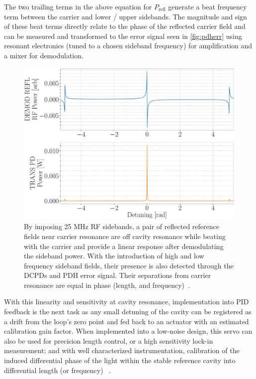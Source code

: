The two trailing terms in the above equation for $P_\mathrm{refl}$ generate a beat frequency term between the carrier and lower / upper sidebands. The magnitude and sign of these beat terms directly relate to the phase of the reflected carrier field and can be measured and transformed to the error signal seen in \autoref{fig:pdherr} using resonant electronics (tuned to a chosen sideband frequency) for amplification and a mixer for demodulation.

\begin{figure}[H]
	\includegraphics[width=.9\textwidth]{figs/ALGAAS/pdh_error.pdf}
	\caption{By imposing 25 MHz RF sidebands, a pair of reflected reference fields near carrier resonance are off cavity resonance while beating with the carrier and provide a linear response after demodulating the sideband power. With the introduction of high and low frequency sideband fields, their presence is also detected through the DCPDs and PDH error signal. Their separations from carrier resonance are equal in phase (length, and frequency)~\cite{Bond:2017}.}
\label{fig:pdherr}
\end{figure}

With this linearity and sensitivity at cavity resonance, implementation into PID feedback is the next task as any small detuning of the cavity can be registered as a drift from the loop's zero point and fed back to an actuator with an estimated calibration gain factor. When implemented into a low-noise design, this servo can also be used for precision length control, or a high sensitivity lock-in measurement; and with well characterized instrumentation, calibration of the induced differential phase of the light within the stable reference cavity into differential length (or frequency) ~\cite{black:pdh}.



